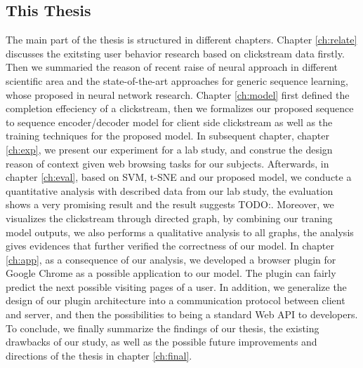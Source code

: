\subsection{This Thesis}



The main part of the thesis is structured in different chapters.
Chapter \ref{ch:relate} discusses the exitsting user behavior research based on clickstream data firstly.
Then we summaried the reason of recent raise of neural approach in different scientific area and the 
state-of-the-art approaches for generic sequence learning, whose proposed in neural network research.
Chapter \ref{ch:model} first defined the completion effeciency of a clickstream, then we
formalizes our proposed sequence to sequence encoder/decoder model for client side
clickstream as well as the training techniques for the proposed model.
In subsequent chapter, chapter \ref{ch:exp}, we present our experiment for a lab study,
and construe the design reason of context given web browsing tasks for our subjects.
Afterwards, in chapter \ref{ch:eval}, based on SVM, t-SNE and our proposed model, 
we conducte a quantitative analysis with described data from our lab study, 
the evaluation shows a very promising result and the result suggests TODO:. %
Moreover, we visualizes the clickstream through directed graph, by combining our traning model outputs,
we also performs a qualitative analysis to all graphs, the analysis gives evidences that further 
verified the correctness of our model.
In chapter \ref{ch:app}, as a consequence of our analysis, we developed a browser plugin 
for Google Chrome as a possible application to our model. The plugin can fairly predict 
the next possible visiting pages of a user. In addition, we generalize the design of
our plugin architecture into a communication protocol between client and server,
and then the possibilities to being a standard Web API to developers.
To conclude, we finally summarize the findings of our thesis, 
the existing drawbacks of our study, as well as the possible 
future improvements and directions of the thesis in chapter \ref{ch:final}.
\cleardoublepage